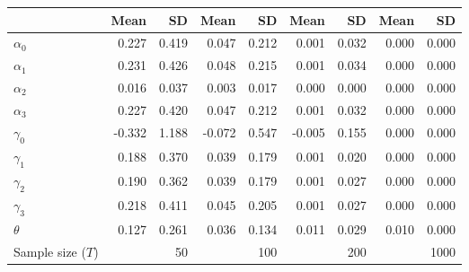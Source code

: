 
\begin{tabular}[t]{lrrrrrrrr}
\toprule
  & Mean & SD & Mean  & SD  & Mean   & SD   & Mean    & SD   \\
\midrule
$\alpha_{0}$ & 0.227 & 0.419 & 0.047 & 0.212 & 0.001 & 0.032 & 0.000 & 0.000\\
$\alpha_{1}$ & 0.231 & 0.426 & 0.048 & 0.215 & 0.001 & 0.034 & 0.000 & 0.000\\
$\alpha_{2}$ & 0.016 & 0.037 & 0.003 & 0.017 & 0.000 & 0.000 & 0.000 & 0.000\\
$\alpha_{3}$ & 0.227 & 0.420 & 0.047 & 0.212 & 0.001 & 0.032 & 0.000 & 0.000\\
$\gamma_{0}$ & -0.332 & 1.188 & -0.072 & 0.547 & -0.005 & 0.155 & 0.000 & 0.000\\
$\gamma_{1}$ & 0.188 & 0.370 & 0.039 & 0.179 & 0.001 & 0.020 & 0.000 & 0.000\\
$\gamma_{2}$ & 0.190 & 0.362 & 0.039 & 0.179 & 0.001 & 0.027 & 0.000 & 0.000\\
$\gamma_{3}$ & 0.218 & 0.411 & 0.045 & 0.205 & 0.001 & 0.027 & 0.000 & 0.000\\
$\theta$ & 0.127 & 0.261 & 0.036 & 0.134 & 0.011 & 0.029 & 0.010 & 0.000\\
Sample size ($T$) &  & 50 &  & 100 &  & 200 &  & 1000\\
\bottomrule
\end{tabular}
